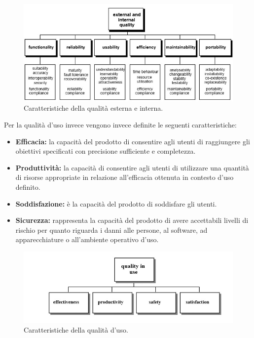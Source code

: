 \documentclass[a4paper]{article}
\begin{document}
				\begin{figure}[H]
				\centering
					\includegraphics[scale=0.65]{immagini/Pdq/metrichediqualita.jpg}
					\caption{Caratteristiche della qualità esterna e interna.}
				\end{figure}
				Per la qualità d'uso invece vengono invece definite le seguenti caratteristiche:
				\begin{itemize}
					\item \textbf{Efficacia:} la capacità del prodotto di consentire agli utenti di raggiungere gli obiettivi
					specificati con precisione sufficiente e completezza. 
					\item \textbf{Produttività:} la capacità di consentire agli utenti di utilizzare una quantità di risorse
					appropriate in relazione all'efficacia ottenuta in contesto d'uso definito. 
					\item \textbf{Soddisfazione:} è la capacità del prodotto di soddisfare gli utenti. 
					\item \textbf{Sicurezza:} rappresenta la capacità del prodotto di avere accettabili livelli di rischio per
					quanto riguarda i danni alle persone, al software, ad apparecchiature o all'ambiente operativo d'uso. 
				\end{itemize}
				
				\begin{figure}[H]
					\centering
					\includegraphics[scale=0.65]{immagini/Pdq/qualitainuso.jpg}
					\caption{Caratteristiche della qualità d'uso.}
				\end{figure}
\end{document}
